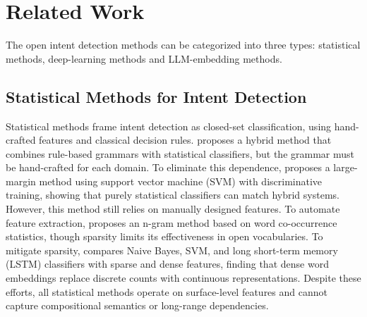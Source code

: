 \section{Related Work}
The open intent detection methods can be categorized into three types: statistical methods, deep-learning methods and LLM-embedding methods.

\subsection{Statistical Methods for Intent Detection}
Statistical methods frame intent detection as closed-set classification, using hand-crafted features and classical decision rules.
\citet{wang2002combination} proposes a hybrid method that combines rule-based grammars with statistical classifiers, but the grammar must be hand-crafted for each domain.
To eliminate this dependence, \citet{haffner2003scaling} proposes a large-margin method using support vector machine (SVM) with discriminative training, showing that purely statistical classifiers can match hybrid systems.
However, this method still relies on manually designed features.
To automate feature extraction, \citet{tur2010what} proposes an n-gram method based on word co-occurrence statistics, though sparsity limits its effectiveness in open vocabularies.
To mitigate sparsity, \citet{schuurmans2020intent} compares Naive Bayes, SVM, and long short-term memory (LSTM) classifiers with sparse and dense features, finding that dense word embeddings replace discrete counts with continuous representations.
Despite these efforts, all statistical methods operate on surface-level features and cannot capture compositional semantics or long-range dependencies.

